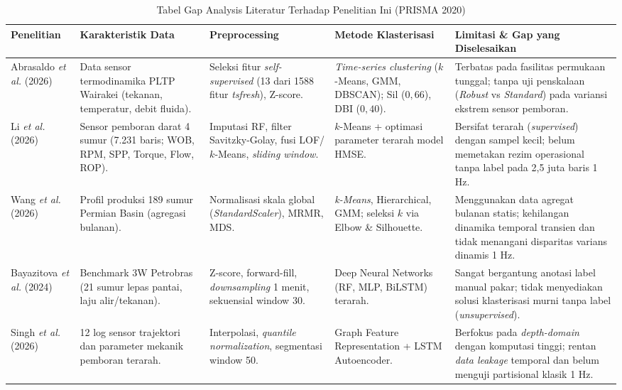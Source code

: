 \documentclass[conference]{IEEEtran}
\begin{document}
\begin{table}[!t]
\caption{Tabel Gap Analysis Literatur Terhadap Penelitian Ini (PRISMA 2020)}
\label{tab:gap1}
\centering
\scriptsize
\renewcommand{\arraystretch}{1.3}
\setlength{\tabcolsep}{3.5pt}
\begin{tabularx}{\textwidth}{@{}>{\raggedright\arraybackslash}p{2.3cm} X X X X@{}}
\toprule
\textbf{Penelitian} & \textbf{Karakteristik Data} & \textbf{Preprocessing} & \textbf{Metode Klasterisasi} & \textbf{Limitasi \& Gap yang Diselesaikan} \\
\midrule
Abrasaldo \textit{et al.} (2026) \cite{abrasaldo2026} & Data sensor termodinamika PLTP Wairakei (tekanan, temperatur, debit fluida). & Seleksi fitur \textit{self-supervised} (13 dari 1588 fitur \textit{tsfresh}), Z-score. & \textit{Time-series clustering} ($k$-Means, GMM, DBSCAN); Sil ($0{,}66$), DBI ($0{,}40$). & Terbatas pada fasilitas permukaan tunggal; tanpa uji penskalaan (\textit{Robust} vs \textit{Standard}) pada variansi ekstrem sensor pemboran. \\
\addlinespace
Li \textit{et al.} (2026) \cite{li2026} & Sensor pemboran darat 4 sumur (7.231 baris; WOB, RPM, SPP, Torque, Flow, ROP). & Imputasi RF, filter Savitzky-Golay, fusi LOF/$k$-Means, \textit{sliding window}. & $k$-Means + optimasi parameter terarah model HMSE. & Bersifat terarah (\textit{supervised}) dengan sampel kecil; belum memetakan rezim operasional tanpa label pada 2,5 juta baris 1 Hz. \\
\addlinespace
Wang \textit{et al.} (2026) \cite{wang2026} & Profil produksi 189 sumur Permian Basin (agregasi bulanan). & Normalisasi skala global (\textit{StandardScaler}), MRMR, MDS. & \textit{k-Means}, Hierarchical, GMM; seleksi $k$ via Elbow \& Silhouette. & Menggunakan data agregat bulanan statis; kehilangan dinamika temporal transien dan tidak menangani disparitas varians dinamis 1 Hz. \\
\addlinespace
Bayazitova \textit{et al.} (2024) \cite{bayazitova2024} & Benchmark 3W Petrobras (21 sumur lepas pantai, laju alir/tekanan). & Z-score, forward-fill, \textit{downsampling} 1 menit, sekuensial window 30. & Deep Neural Networks (RF, MLP, BiLSTM) terarah. & Sangat bergantung anotasi label manual pakar; tidak menyediakan solusi klasterisasi murni tanpa label (\textit{unsupervised}). \\
\addlinespace
Singh \textit{et al.} (2026) \cite{singh2026} & 12 log sensor trajektori dan parameter mekanik pemboran terarah. & Interpolasi, \textit{quantile normalization}, segmentasi window 50. & Graph Feature Representation + LSTM Autoencoder. & Berfokus pada \textit{depth-domain} dengan komputasi tinggi; rentan \textit{data leakage} temporal dan belum menguji partisional klasik 1 Hz. \\

\end{tabularx}
\end{table}
\end{document}
